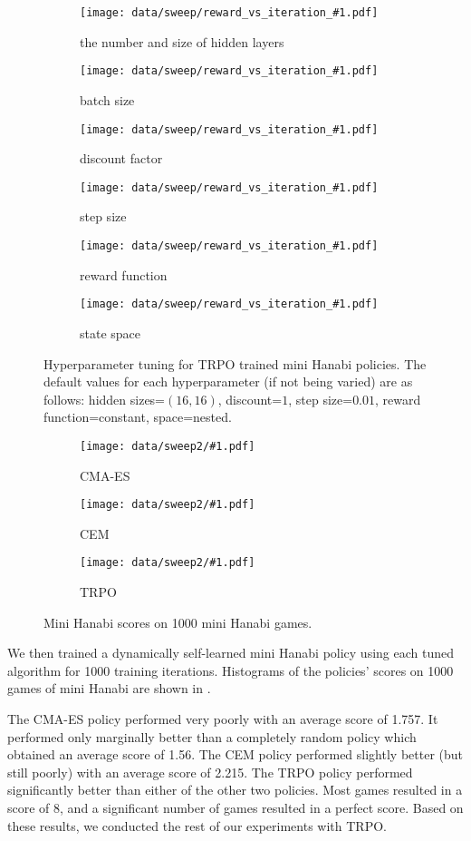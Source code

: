 \begin{figure}[ht]
  \newcommand{\hyperparamsubfig}[3]{%
    \begin{subfigure}[t]{0.32\textwidth}
      \centering
      \texttt{[image: data/sweep/reward\_vs\_iteration\_\#1.pdf]}
      \caption{#2}\label{fig:#3}
    \end{subfigure}
  }

  \centering

  \hyperparamsubfig{hidden_sizes}{the number and size of hidden layers}{}
  \hyperparamsubfig{batch_size}{batch size}{}
  \hyperparamsubfig{discount}{discount factor}{}

  \hyperparamsubfig{step_size}{step size}{}
  \hyperparamsubfig{reward}{reward function}{}
  \hyperparamsubfig{space}{state space}{}

  \caption{
    Hyperparameter tuning for TRPO trained mini Hanabi policies. The default
    values for each hyperparameter (if not being varied) are as follows: hidden
    sizes=$(16, 16)$, discount=$1$, step size=$0.01$, reward function=constant,
    space=nested.
  }\label{fig:trpo-tuning}
\end{figure}

\begin{figure}[ht]
  \newcommand{\algosubfig}[3]{%
    \begin{subfigure}[b]{0.32\textwidth}
      \centering
      \texttt{[image: data/sweep2/\#1.pdf]}
      \caption{#2}\label{fig:#3}
    \end{subfigure}
  }

  \centering
  \algosubfig{CMA-ES}{CMA-ES}{cmaes}
  \algosubfig{CEM}{CEM}{cem}
  \algosubfig{TRPO}{TRPO}{trpo}
  \caption{Mini Hanabi scores on 1000 mini Hanabi games.}\label{fig:algos}
\end{figure}

We then trained a dynamically self-learned mini Hanabi policy using each
tuned algorithm for 1000 training iterations. Histograms of the policies'
scores on 1000 games of mini Hanabi are shown in .

The CMA-ES policy performed very poorly with an average score of 1.757. It
performed only marginally better than a completely random policy which obtained
an average score of 1.56.
%
The CEM policy performed slightly better (but still poorly) with an average
score of 2.215.
%
The TRPO policy performed significantly better than either of the other two
policies. Most games resulted in a score of 8, and a significant number of
games resulted in a perfect score.
%
Based on these results, we conducted the rest of our experiments with TRPO.

